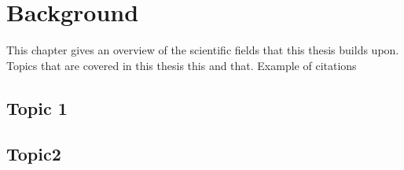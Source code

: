 

\chapter{Background}
\label{chap:background}

This chapter gives an overview of the scientific fields that this thesis builds
upon. Topics that are covered in this thesis this and that.
\lipsum[1-2]
Example of citations
\cite{deodato2020bayesian,gabel2015ann}
\section{Topic 1}
\label{intro:sec:t1}
\lipsum[6-7]

\section{Topic2}
\label{intro:sec:t2}
\lipsum[6-7]



